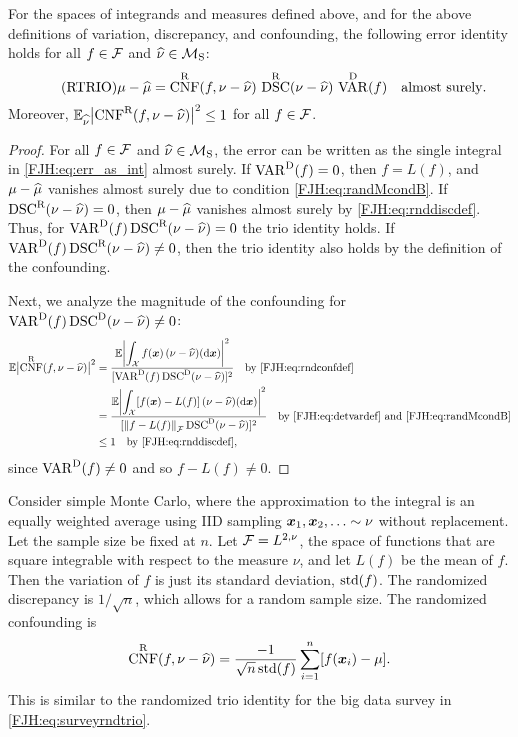 \documentclass[graybox,footinfo]{svmult}
\DeclareMathOperator{\algn}{CNF}
\DeclareMathOperator{\disc}{DSC}
\DeclareMathOperator{\Var}{VAR}
\begin{document}
\begin{theorem}  \label{FJH:thm:rtrio} For the spaces of 
integrands and 
	measures defined above, and for the above definitions of variation, discrepancy, and 
	confounding, the following error identity holds for all $f \in \mathcal{F}$ and $\widehat{\nu}  \in 
	\mathcal{M}_{\textup{S}}$: 
	\begin{equation} \tag{RTRIO} \label{FJH:eq:rtrio}
	\mu - \hmu  = \algn^\Rn(f,\nu - \hnu) \, \disc^\Rn(\nu - \hnu) \, \Var^{\Dt}(f) \quad 
	\text{almost surely}.
	\end{equation}
	Moreover, $\Ex_{\hnu} \abs{\algn^\Rn(f,\nu - \hnu)}^2  \le 1$ for all $f \in 
	\mathcal{F}$. 
\end{theorem}
\begin{proof}  For all $f \in \mathcal{F}$ and $\widehat{\nu}  \in \mathcal{M}_{\textup{S}}$, the error can be 
written as the single integral in \eqref{FJH:eq:err_as_int} almost surely. 	If $\Var^{\Dt}(f) 
= 0$, then $f = L(f)$, and $\mu - \widehat{\mu}$ vanishes almost surely due to condition 
\eqref{FJH:eq:randMcondB}.  If 
$\disc^\Rn(\nu - \hnu) = 0$, then $\mu - \widehat{\mu}$
	vanishes almost surely by \eqref{FJH:eq:rnddiscdef}.  Thus, for $\Var^{\Dt}(f) 
	\disc^\Rn(\nu - \hnu) = 
	0$ 
	the trio identity holds. If $\Var^{\Dt}(f) \disc^\Rn(\nu - \hnu) \ne 0$, then the trio 
	identity also holds by the definition of the confounding.
	
	Next, we analyze the magnitude of the confounding for $\Var^{\Dt}(f) \disc^\Dt(\nu - 
	\hnu) \ne 0$: 
	\begin{align*}
	\bbE \abs{\algn^\Rn(f,\nu - \hnu)}^2 & = 
	\frac{\bbE \biggl \lvert\displaystyle\int_{\cx} f(\bsx) \, (\nu - \hnu)(\D 
		\bsx) \biggr \rvert^2 }{[\Var^\Dt(f)\disc^\Dt(\nu - \hnu)]^2} \quad \text{by 
		\eqref{FJH:eq:rndconfdef}}\\
	& = \frac{\bbE \biggl \lvert\displaystyle\int_{\cx} [f(\bsx) - L(f)] \, (\nu - \hnu)(\D 
		\bsx) \biggr \rvert^2}{[\norm{f-L(f)}_{\cf}\disc^\Dt(\nu - \hnu)]^2} \quad \text{by 
		\eqref{FJH:eq:detvardef} and \eqref{FJH:eq:randMcondB}} \\
	& \le 1 \quad \text{by \eqref{FJH:eq:rnddiscdef}},
	\end{align*}
	since $\Var^{\Dt}(f) \ne 0$ and so $f - L(f) \ne 0$.
\end{proof}

Consider simple Monte Carlo, where the approximation to the integral is an equally 
weighted average using IID sampling ${\boldsymbol{x}}_1, {\boldsymbol{x}}_2, \ldots \sim 
\nu$ without 
replacement. Let the sample size be fixed at $n$.
Let $\mathcal{F} = L^{2,\nu}$, the space of functions that are square integrable with respect to 
the measure $\nu$, and let $L(f)$ be the mean of $f$.  Then the variation of $f$ is just 
its standard 
deviation, $\textup{std}(f)$.  The randomized discrepancy is 
$1/\sqrt{n}$, which allows for a random sample size.  The randomized 
confounding is 
\begin{align*}
\algn^\Rn(f,\nu - \hnu) = \frac{-1}{ \sqrt{n}\, \std(f)}    \sum_{i=1}^n [f(\bsx_i) - 
\mu].
\end{align*}
This is similar to the randomized trio identity for the big data survey in 
\eqref{FJH:eq:surveyrndtrio}.
\end{document}
